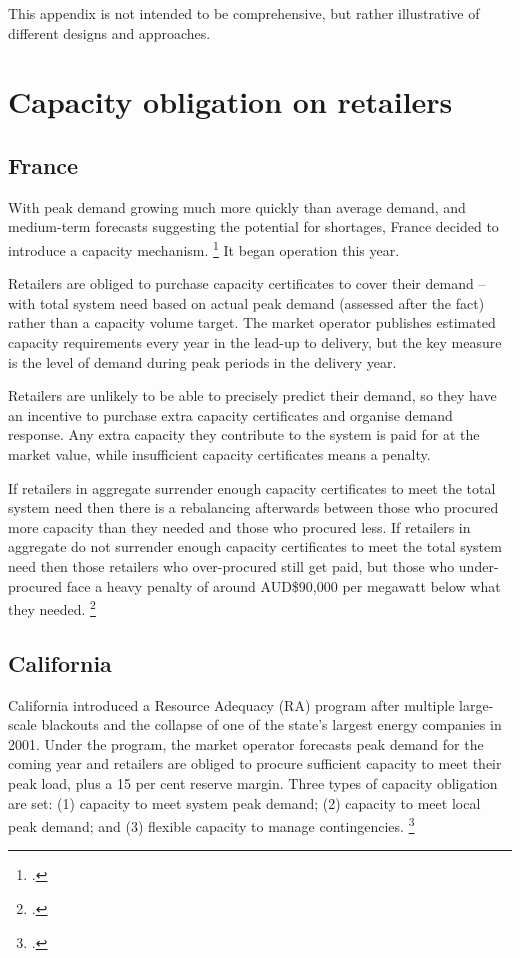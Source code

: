 \documentclass[FrontPage]{grattan}
\begin{document}
This appendix is not intended to be comprehensive, but rather illustrative of different designs and approaches.

\section{Capacity obligation on retailers}\label{sec:appendix-capacity-obligation-on-retailers} 
\subsection{France}\label{subsec:appendix-france} 
With peak demand growing much more quickly than average demand, and medium-term forecasts suggesting the potential for shortages, France decided to introduce a capacity mechanism.%
\footcite[][78]{CIGRE2016CapacityMechanisms}
It began operation this year.

Retailers are obliged to purchase capacity certificates to cover their demand -- with total system need based on actual peak demand (assessed after the fact) rather than a capacity volume target. The market operator publishes estimated capacity requirements every year in the lead-up to delivery, but the key measure is the level of demand during peak periods in the delivery year.

Retailers are unlikely to be able to precisely predict their demand, so they have an incentive to purchase extra capacity certificates and organise demand response. Any extra capacity they contribute to the system is paid for at the market value, while insufficient capacity certificates means a penalty.

If retailers in aggregate surrender enough capacity certificates to meet the total system need then there is a rebalancing afterwards between those who procured more capacity than they needed and those who procured less. If retailers in aggregate do not surrender enough capacity certificates to meet the total system need then those retailers who over-procured still get paid, but those who under-procured face a heavy penalty of around AUD\$90,000 per megawatt below what they needed.%
\footcite{RTE2014CapacityObligationReport}

\subsection{California}\label{subsec:appendix-california} 
California introduced a Resource Adequacy (RA) program after multiple large-scale blackouts and the collapse of one of the state's largest energy companies in 2001. Under the program, the market operator forecasts peak demand for the coming year and retailers are obliged to procure sufficient capacity to meet their peak load, plus a 15 per cent reserve margin. Three types of capacity obligation are set: (1) capacity to meet system peak demand; (2) capacity to meet local peak demand; and (3) flexible capacity to manage contingencies.%
\footcite{CPUC2017ResourceAdequacy}
\end{document}
